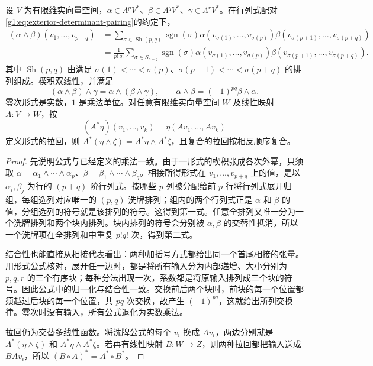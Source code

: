 \begin{proposition}
	\label{g1:prop:wedge-algebra}
	设 \(V\) 为有限维实向量空间，\(\alpha\in\Lambda^pV^*\)、\(\beta\in\Lambda^qV^*\)、\(\gamma\in\Lambda^rV^*\)。在行列式配对\eqref{g1:eq:exterior-determinant-pairing}的约定下，
	\begin{equation}
		\label{g1:eq:wedge-shuffle}
		\begin{split}
			(\alpha\wedge\beta)(v_1,\ldots,v_{p+q})
			&=\sum_{\sigma\in\operatorname{Sh}(p,q)}\operatorname{sgn}(\sigma)
			\alpha(v_{\sigma(1)},\ldots,v_{\sigma(p)})
			\beta(v_{\sigma(p+1)},\ldots,v_{\sigma(p+q)})\\
			&=\frac1{p!\,q!}\sum_{\sigma\in S_{p+q}}\operatorname{sgn}(\sigma)
			\alpha(v_{\sigma(1)},\ldots,v_{\sigma(p)})
			\beta(v_{\sigma(p+1)},\ldots,v_{\sigma(p+q)}).
		\end{split}
	\end{equation}
	其中 \(\operatorname{Sh}(p,q)\) 由满足 \(\sigma(1)<\cdots<\sigma(p)\)、\(\sigma(p+1)<\cdots<\sigma(p+q)\) 的排列组成。楔积双线性，并满足
	\[
		(\alpha\wedge\beta)\wedge\gamma=\alpha\wedge(\beta\wedge\gamma),\qquad
		\alpha\wedge\beta=(-1)^{pq}\beta\wedge\alpha.
	\]
	零次形式是实数，\(1\) 是乘法单位。对任意有限维实向量空间 \(W\) 及线性映射 \(A:V\to W\)，按
	\[
		(A^*\eta)(v_1,\ldots,v_k)=\eta(Av_1,\ldots,Av_k)
	\]
	定义形式的拉回，则 \(A^*(\eta\wedge\zeta)=A^*\eta\wedge A^*\zeta\)，且复合的拉回按相反顺序复合。
\end{proposition}
\begin{proof}
	先说明公式与已经定义的乘法一致。由于一形式的楔积张成各次外幂，只须取 \(\alpha=\alpha_1\wedge\cdots\wedge\alpha_p\)、\(\beta=\beta_1\wedge\cdots\wedge\beta_q\)。相接所得形式在 \(v_1,\ldots,v_{p+q}\) 上的值，是以 \(\alpha_i,\beta_j\) 为行的 \((p+q)\) 阶行列式。按哪些 \(p\) 列被分配给前 \(p\) 行将行列式展开归组，每组选列对应唯一的 \((p,q)\) 洗牌排列；组内的两个行列式正是 \(\alpha\) 和 \(\beta\) 的值，分组选列的符号就是该排列的符号。这得到第一式。任意全排列又唯一分为一个洗牌排列和两个块内排列。块内排列的符号会分别被 \(\alpha,\beta\) 的交替性抵消，所以一个洗牌项在全排列和中重复 \(p!q!\) 次，得到第二式。

	结合性也能直接从相接代表看出：两种加括号方式都给出同一个首尾相接的张量。用形式公式核对，展开任一边时，都是将所有输入分为内部递增、大小分别为 \(p,q,r\) 的三个有序块；每种分法出现一次，系数都是将原输入排列成三个块的符号。因此公式中的归一化与结合性一致。交换前后两个块时，前块的每一个位置都须越过后块的每一个位置，共 \(pq\) 次交换，故产生 \((-1)^{pq}\)，这就给出所列交换律。零次时没有输入，所有公式退化为实数乘法。

	拉回仍为交替多线性函数。将洗牌公式的每个 \(v_i\) 换成 \(Av_i\)，两边分别就是 \(A^*(\eta\wedge\zeta)\) 和 \(A^*\eta\wedge A^*\zeta\)。若再有线性映射 \(B:W\to Z\)，则两种拉回都把输入送成 \(BAv_i\)，所以 \((B\circ A)^*=A^*\circ B^*\)。
\end{proof}

